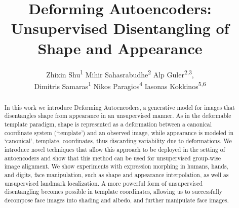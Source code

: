 \documentclass[runningheads]{llncs}
\begin{document}
\mainmatter
\title{Deforming Autoencoders: Unsupervised Disentangling of Shape and Appearance} 


\author{Zhixin Shu\textsuperscript{1}
\hspace{0.7cm}
Mihir Sahasrabudhe\textsuperscript{2} 
\hspace{0.7cm}
Alp Guler\textsuperscript{2,3}, \\ 
Dimitris Samaras\textsuperscript{1}
\hspace{0.7cm}
Nikos Paragios\textsuperscript{4} 
\hspace{0.7cm}
Iasonas Kokkinos\textsuperscript{5,6}}





\newcommand\nl\newline

\maketitle


\begin{abstract}
In this work we introduce  Deforming Autoencoders, a generative model for images that disentangles shape from appearance in an  unsupervised manner.
As in the deformable template paradigm, shape is represented as a deformation between a canonical coordinate system (`template') and an observed image, while appearance is modeled in `canonical', template, coordinates, thus discarding variability due to deformations.
We introduce novel techniques that allow this approach to be deployed in the setting of autoencoders and show that this method can be used for unsupervised group-wise image alignment. We show experiments with expression morphing in humans, hands, and digits, face manipulation, such as shape and appearance interpolation,  as well as unsupervised landmark localization. A more powerful form of unsupervised disentangling becomes possible in template coordinates, allowing us to successfully decompose face images into shading and albedo, and further manipulate face images.
\end{abstract}
\end{document}
